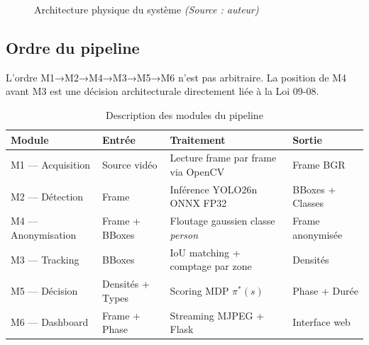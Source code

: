 \begin{figure}[H]
{}
\caption{Architecture physique du système
         \textit{(Source : auteur)}}
\label{fig:physical_architecture}
\end{figure}

\subsection{Ordre du pipeline}

L'ordre M1→M2→M4→M3→M5→M6 n'est pas
arbitraire. La position de M4 avant M3
est une décision architecturale directement
liée à la Loi 09-08.

\begin{table}[H]
\centering
\caption{Description des modules du pipeline}
\footnotesize
\renewcommand{\arraystretch}{1.15}
\begin{tabularx}{\textwidth}{@{}
  >{\raggedright\arraybackslash}p{3.2cm}
  >{\raggedright\arraybackslash}p{2.4cm}
  >{\raggedright\arraybackslash}X
  >{\raggedright\arraybackslash}p{2.7cm}
@{}}
\toprule
\textbf{Module} &
\textbf{Entrée} &
\textbf{Traitement} &
\textbf{Sortie} \\
\midrule
M1 — Acquisition &
Source vidéo &
Lecture frame par frame via OpenCV &
Frame BGR \\
M2 — Détection &
Frame &
Inférence YOLO26n ONNX FP32 &
BBoxes + Classes \\
M4 — Anonymisation &
Frame + BBoxes &
Floutage gaussien classe \textit{person} &
Frame anonymisée \\
M3 — Tracking &
BBoxes &
IoU matching + comptage par zone &
Densités \\
M5 — Décision &
Densités + Types &
Scoring MDP $\pi^*(s)$ &
Phase + Durée \\
M6 — Dashboard &
Frame + Phase &
Streaming MJPEG + Flask &
Interface web \\
\bottomrule
\end{tabularx}
\label{tab:modules}
\end{table}

